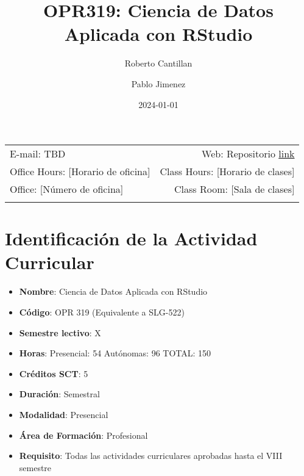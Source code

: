 \documentclass[11pt,letter,]{article}
\title{OPR319: Ciencia de Datos Aplicada con RStudio}
\author{Roberto Cantillan \and Pablo Jimenez}
\date{2024-01-01}
\providecommand{\tightlist}{%
  \setlength{\itemsep}{0pt}\setlength{\parskip}{0pt}}
\begin{document}
  

		\maketitle
		
	
		\thispagestyle{firststyle}



	\noindent \begin{tabular*}{\textwidth}{ @{\extracolsep{\fill}} lr @{\extracolsep{\fill}}}


E-mail: TBD & Web: Repositorio \href{https://github.com/rcantillan/OPR319-Ciencia-de-datos-con-R}{link}\\
Office Hours: {[}Horario de oficina{]}  &  Class Hours: {[}Horario de
clases{]}\\
Office: {[}Número de oficina{]}  & Class Room: {[}Sala de clases{]}\\
	&  \\
	\hline
	\end{tabular*}
	
\vspace{2mm}
	


\hypertarget{identificaciuxf3n-de-la-actividad-curricular}{%
\section{Identificación de la Actividad
Curricular}\label{identificaciuxf3n-de-la-actividad-curricular}}

\begin{itemize}
\tightlist
\item
  \textbf{Nombre}: Ciencia de Datos Aplicada con RStudio
\item
  \textbf{Código}: OPR 319 (Equivalente a SLG-522)
\item
  \textbf{Semestre lectivo}: X
\item
  \textbf{Horas}: Presencial: 54 \textbar{} Autónomas: 96 \textbar{}
  TOTAL: 150
\item
  \textbf{Créditos SCT}: 5
\item
  \textbf{Duración}: Semestral
\item
  \textbf{Modalidad}: Presencial
\item
  \textbf{Área de Formación}: Profesional
\item
  \textbf{Requisito}: Todas las actividades curriculares aprobadas hasta
  el VIII semestre
\end{itemize}
\end{document}
